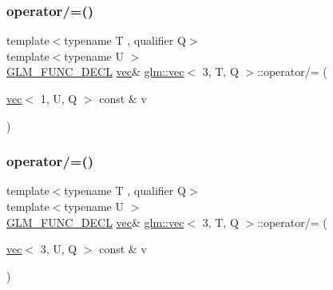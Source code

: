 \mbox{\label{structglm_1_1vec_3_013_00_01_t_00_01_q_01_4_a99545518c14ab942bec2a08acd578352}} 
\subsubsection{\texorpdfstring{operator/=()}{operator/=()}\hspace{0.1cm}{\footnotesize\ttfamily [2/6]}}
{\footnotesize\ttfamily template$<$typename T , qualifier Q$>$ \\
template$<$typename U $>$ \\
\hyperlink{setup_8hpp_ab2d052de21a70539923e9bcbf6e83a51}{G\+L\+M\+\_\+\+F\+U\+N\+C\+\_\+\+D\+E\+CL} \hyperlink{structglm_1_1vec}{vec}\& \hyperlink{structglm_1_1vec}{glm\+::vec}$<$ 3, T, Q $>$\+::operator/= (\begin{DoxyParamCaption}\item[{\hyperlink{structglm_1_1vec}{vec}$<$ 1, U, Q $>$ const \&}]{v }\end{DoxyParamCaption})}

\mbox{\label{structglm_1_1vec_3_013_00_01_t_00_01_q_01_4_ab0b3e69d8f5ae4e3a43203c29c1b9918}} 
\subsubsection{\texorpdfstring{operator/=()}{operator/=()}\hspace{0.1cm}{\footnotesize\ttfamily [3/6]}}
{\footnotesize\ttfamily template$<$typename T , qualifier Q$>$ \\
template$<$typename U $>$ \\
\hyperlink{setup_8hpp_ab2d052de21a70539923e9bcbf6e83a51}{G\+L\+M\+\_\+\+F\+U\+N\+C\+\_\+\+D\+E\+CL} \hyperlink{structglm_1_1vec}{vec}\& \hyperlink{structglm_1_1vec}{glm\+::vec}$<$ 3, T, Q $>$\+::operator/= (\begin{DoxyParamCaption}\item[{\hyperlink{structglm_1_1vec}{vec}$<$ 3, U, Q $>$ const \&}]{v }\end{DoxyParamCaption})}

